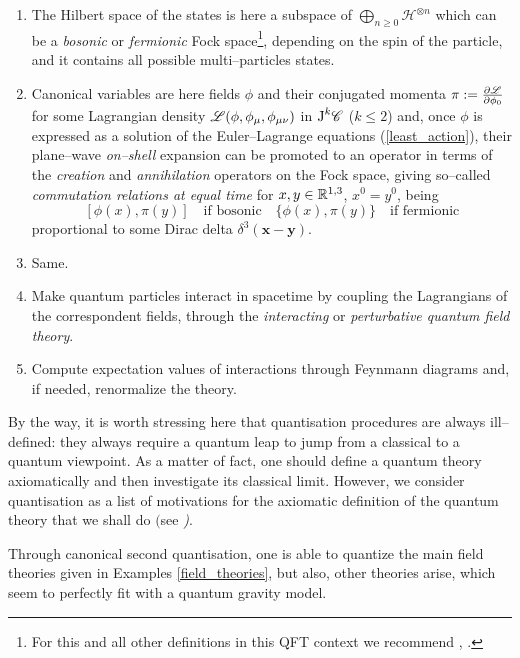 \begin{enumerate}
    \item The Hilbert space of the states is here a subspace of $\bigoplus_{n\geq0}\mathcal{H}^{\otimes n}$ which can be a \emph{bosonic} or \emph{fermionic} Fock space\footnote{For this and all other definitions in this QFT context we recommend \cite{talagrand}, \cite{peskin}.}, depending on the spin of the particle, and it contains all possible multi--particles states.

    \item Canonical variables are here fields $\phi$ and their conjugated momenta $\pi:=\frac{\partial\mathscr{L}}{\partial\phi_0}$ for some Lagrangian density $\mathscr{L}(\phi,\phi_\mu,\phi_{\mu\nu})$ in $\text{\normalfont J}^k\mathscr{C}$ ($k\leq2$) and, once $\phi$ is expressed as a solution of the Euler--Lagrange equations (\ref{least_action}), their plane--wave \emph{on--shell} expansion can be promoted to an operator in terms of the \emph{creation} and \emph{annihilation}  operators on the Fock space, giving so--called \emph{commutation relations at equal time} for $x,y\in\mathbb{R}^{1,3}$, $x^0=y^0$, being
    $$[\phi(x),\pi(y)]\quad\text{if bosonic}\quad\{\phi(x),\pi(y)\}\quad\text{if fermionic}$$
    proportional to some Dirac delta $\delta^3(\mathbf{x}-\mathbf{y})$.

    \item Same.

    \item Make quantum particles interact in spacetime by coupling the Lagrangians of the correspondent fields, through the \emph{interacting} or \emph{perturbative quantum field theory}.

    \item Compute expectation values of interactions through Feynmann diagrams and, if needed, renormalize the theory.
\end{enumerate}

\begin{remark}
    By the way, it is worth stressing here that quantisation procedures are always ill--defined: they always require a quantum leap to jump from a classical to a quantum viewpoint. As a matter of fact, one should define a quantum theory axiomatically and then investigate its classical limit. However, we consider quantisation as a list of motivations for the axiomatic definition of the quantum theory that we shall do $($see \emph{\cite{LN3})}.
\end{remark}

Through canonical second quantisation, one is able to quantize the main field theories given in Examples \ref{field_theories}, but also, other theories arise, which seem to perfectly fit with a quantum gravity model. 

